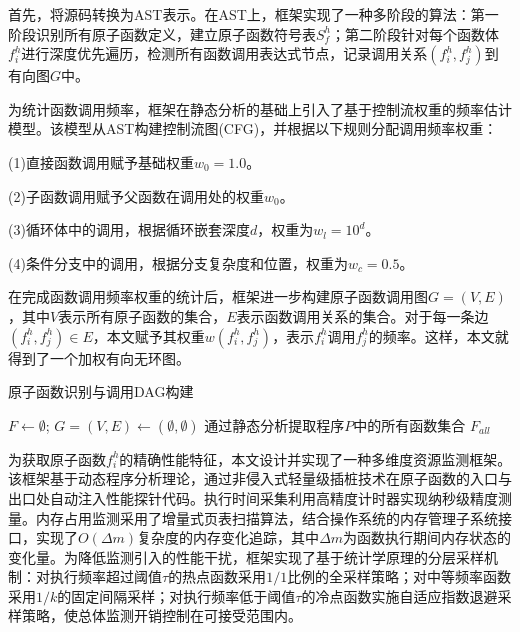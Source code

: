 首先，将源码转换为AST表示。在AST上，框架实现了一种多阶段的算法：第一阶段识别所有原子函数定义，建立原子函数符号表$S_f^h$；第二阶段针对每个函数体$f_i^h$进行深度优先遍历，检测所有函数调用表达式节点，记录调用关系$(f_i^h, f_j^h)$到有向图$G$中。

为统计函数调用频率，框架在静态分析的基础上引入了基于控制流权重的频率估计模型。该模型从AST构建控制流图(CFG)，并根据以下规则分配调用频率权重：

(1)直接函数调用赋予基础权重$w_0=1.0$。 

(2)子函数调用赋予父函数在调用处的权重$w_0$。 

(3)循环体中的调用，根据循环嵌套深度$d$，权重为$w_l=10^d$。

(4)条件分支中的调用，根据分支复杂度和位置，权重为$w_c=0.5$。

在完成函数调用频率权重的统计后，框架进一步构建原子函数调用图$G=(V, E)$，其中$V$表示所有原子函数的集合，$E$表示函数调用关系的集合。对于每一条边$(f_i^h, f_j^h) \in E$，本文赋予其权重$w(f_i^h, f_j^h)$，表示$f_i^h$调用$f_j^h$的频率。这样，本文就得到了一个加权有向无环图。

\begin{algorithm}[ht]
	\caption{原子函数识别与调用DAG构建}
	\label{atomic_function_dag}
	\SetAlgoLined
	
	$F \gets \emptyset$; $G=(V,E) \gets (\emptyset, \emptyset)$\;
	通过静态分析提取程序$P$中的所有函数集合 $F_{all}$\;
	\;
\end{algorithm}

为获取原子函数$f_{i}^{h}$的精确性能特征，本文设计并实现了一种多维度资源监测框架。该框架基于动态程序分析理论，通过非侵入式轻量级插桩技术在原子函数的入口与出口处自动注入性能探针代码。执行时间采集利用高精度计时器实现纳秒级精度测量。内存占用监测采用了增量式页表扫描算法，结合操作系统的内存管理子系统接口，实现了$O(\Delta m)$复杂度的内存变化追踪，其中$\Delta m$为函数执行期间内存状态的变化量。为降低监测引入的性能干扰，框架实现了基于统计学原理的分层采样机制：对执行频率超过阈值$\tau$的热点函数采用$1/1$比例的全采样策略；对中等频率函数采用$1/k$的固定间隔采样；对执行频率低于阈值$\tau$的冷点函数实施自适应指数退避采样策略，使总体监测开销控制在可接受范围内。

